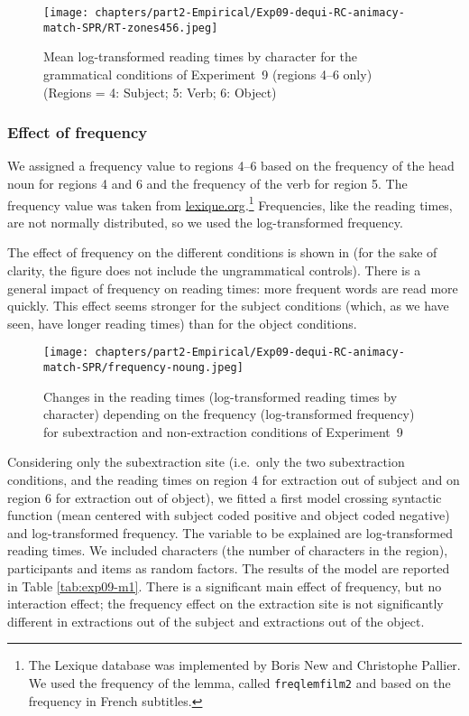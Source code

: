 \begin{figure}
    \centering
    \texttt{[image: chapters/part2-Empirical/Exp09-dequi-RC-animacy-match-SPR/RT-zones456.jpeg]}
    \caption[Mean log-transformed reading times by character for the grammatical conditions of Experiment~9 (regions 4--6 only)]{Mean log-transformed reading times by character for the grammatical conditions of Experiment~9 (regions 4--6 only)\\
    (Regions = 4: Subject; 5: Verb; 6: Object)}
    \label{fig:exp09-rt-456}
\end{figure}

\pagebreak
\subsubsection{Effect of frequency} 

We assigned a frequency value to regions 4--6 based on the frequency of the head noun for regions 4 and 6 and the frequency of the verb for region 5. The frequency value was taken from \url{lexique.org}.\footnote{The Lexique database was implemented by Boris New and Christophe Pallier. We used the frequency of the lemma, called \texttt{freqlemfilm2} and based on the frequency in French subtitles.} Frequencies, like the reading times, are not normally distributed, so we used the log-transformed frequency.

The effect of frequency on the different conditions is shown in  (for the sake of clarity, the figure does not include the ungrammatical controls). There is a general impact of frequency on reading times: more frequent words are read more quickly. This effect seems stronger for the subject conditions (which, as we have seen, have longer reading times) than for the object conditions. 

\begin{figure}
    \centering
    \texttt{[image: chapters/part2-Empirical/Exp09-dequi-RC-animacy-match-SPR/frequency-noung.jpeg]}
    \caption{Changes in the reading times (log-transformed reading times by character) depending on the frequency (log-transformed frequency) for subextraction and non-extraction conditions of Experiment~9}
    \label{fig:exp09-frequency}
\end{figure}

Considering only the subextraction site (i.e.\ only the two subextraction conditions, and the reading times on region 4 for extraction out of subject and on region 6 for extraction out of object), we fitted a first model crossing syntactic function (mean centered with subject coded positive and object coded negative) and log-transformed frequency. The variable to be explained are log-transformed reading times. We included characters (the number of characters in the region), participants and items as random factors. The results of the model are reported in Table \ref{tab:exp09-m1}. 
There is a significant main effect of frequency, but no interaction effect; the frequency effect on the extraction site is not significantly different in extractions out of the subject and extractions out of the object. 

